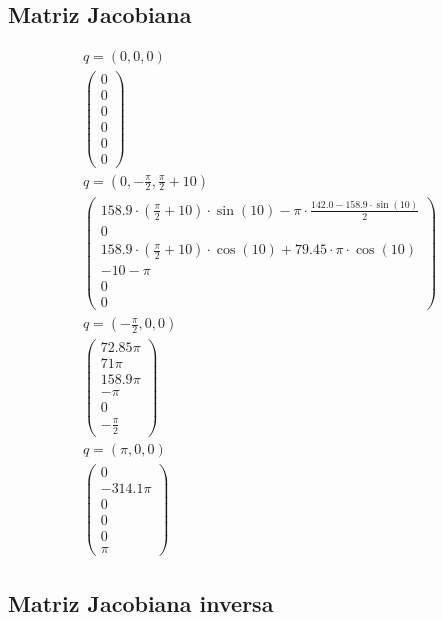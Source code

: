 \documentclass[a4paper,12pt]{article}
\begin{document}
\subsection{Matriz Jacobiana}
{\centering\begin{align*}
    q = \left(0, 0, 0\right) \\
    \begin{pmatrix}
        0 \\
        0 \\
        0 \\
        0 \\
        0 \\
        0
    \end{pmatrix} \\
    q = \left(0, -\frac{\pi}{2}, \frac{\pi}{2} + 10\right) \\
    \begin{pmatrix}
        158.9\cdot(\frac{\pi}{2} + 10)\cdot\sin(10) - \pi\cdot\frac{142.0 - 158.9\cdot\sin(10)}{2} \\
        0 \\
        158.9\cdot(\frac{\pi}{2} + 10)\cdot\cos(10) + 79.45\cdot\pi\cdot\cos(10) \\
        -10 - \pi \\
        0 \\
        0
    \end{pmatrix} \\
    q = \left(-\frac{\pi}{2}, 0, 0\right) \\
    \begin{pmatrix}
        72.85\pi \\
        71\pi \\
        158.9\pi \\
        - \pi \\
        0 \\
        -\frac{\pi}{2}
    \end{pmatrix} \\
    q = \left(\pi, 0,0\right) \\
    \begin{pmatrix}
        0 \\
        -314.1\pi \\
        0 \\
        0 \\
        0 \\
        \pi
    \end{pmatrix}
\end{align*}}

\subsection{Matriz Jacobiana inversa}
\end{document}
